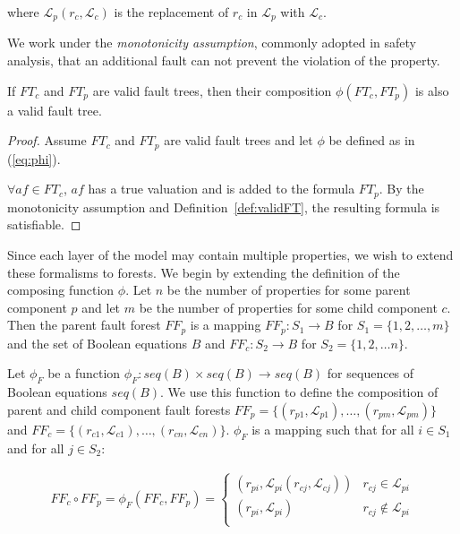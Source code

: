 where $\mathcal{L}_p(r_c, \mathcal{L}_c)$ is the replacement of $r_c$ in $\mathcal{L}_p$ with $\mathcal{L}_c$.

We work under the {\em monotonicity assumption}, commonly adopted in safety analysis, that an additional fault can not prevent the violation of the property. 

\begin{lemma} If $\mathit{FT}_c$ and $\mathit{FT}_p$ are valid fault trees, then their composition $\phi(\mathit{FT}_c, \mathit{FT}_p)$ is also a valid fault tree. 
\begin{proof}
Assume $\mathit{FT}_c$ and $\mathit{FT}_p$ are valid fault trees and let $\phi$ be defined as in (\ref{eq:phi}).  

 $\forall \mathit{af} \in \mathit{FT}_c$, $\mathit{af}$ has a true valuation and is added to the formula $\mathit{FT}_p$. By the monotonicity assumption and Definition~\ref{def:validFT}, the resulting formula is satisfiable. 
\end{proof}
\label{lemma:validTree}
\end{lemma}

Since each layer of the model may contain multiple properties, we wish to extend these formalisms to forests. We begin by extending the definition of the composing function $\phi$. Let $n$ be the number of properties for some parent component $p$ and let $m$ be the number of properties for some child component $c$. Then the parent fault forest $\mathit{FF}_p$ is a mapping $\mathit{FF}_p : S_1 \rightarrow B$ for $S_1 = \{1,2,\dots,m\}$ and the set of Boolean equations $B$ and $\mathit{FF}_c: S_2 \rightarrow B$ for $S_2 = \{1,2,\dots n\}$. 

Let $\phi_F$ be a function $\phi _F: \mathit{seq(B)} \times \mathit{seq(B)} \rightarrow \mathit{seq(B)}$ for sequences of Boolean equations $\mathit{seq(B)}$. We use this function to define the composition of parent and child component fault forests $\mathit{FF}_p = \{(r_{p1},\mathcal{L}_{p1}), \dots, (r_ {pm}, \mathcal{L}_{pm})\}$ and $\mathit{FF}_c = \{(r_{c1},\mathcal{L}_{c1}), \dots, (r_ {cn}, \mathcal{L}_{cn})\}$. $\phi_F$ is a mapping such that for all $i \in S_1$ and for all $j \in S_2$: 

\begin{gather}
\mathit{FF}_c \circ \mathit{FF}_p = \phi_F(\mathit{FF}_c, \mathit{FF}_p) =\begin{cases} 
      (r_{pi}, \mathcal{L}_{pi}(r_{cj}, \mathcal{L}_{cj})) & r_{cj} \in \mathcal{L}_{pi} \\
      (r_{pi}, \mathcal{L}_{pi}) & r_{cj} \not\in \mathcal{L}_{pi} \\
   \end{cases}
\end{gather}

